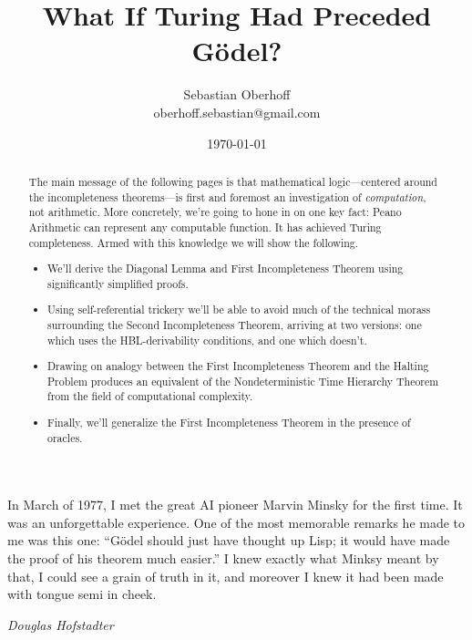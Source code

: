 \documentclass{article}
\theoremstyle{customstyle}
\begin{document}
\title{\vspace{-1cm}What If Turing Had Preceded Gödel?}
\author{Sebastian Oberhoff\\{\small oberhoff.sebastian@gmail.com}}
\date{\today}

\maketitle

\begin{abstract}
  The main message of the following pages is that mathematical logic---centered around the incompleteness theorems---is first and foremost an investigation of \emph{computation}, not arithmetic. More concretely, we're going to hone in on one key fact: Peano Arithmetic can represent any computable function. It has achieved Turing completeness. Armed with this knowledge we will show the following.
  \begin{itemize}
    \item We'll derive the Diagonal Lemma and First Incompleteness Theorem using significantly simplified proofs.
    \item Using self-referential trickery we'll be able to avoid much of the technical morass surrounding the Second Incompleteness Theorem, arriving at two versions: one which uses the HBL-derivability conditions, and one which doesn't.
    \item Drawing on analogy between the First Incompleteness Theorem and the Halting Problem produces an equivalent of the Nondeterministic Time Hierarchy Theorem from the field of computational complexity.
    \item Finally, we'll generalize the First Incompleteness Theorem in the presence of oracles.
  \end{itemize}
\end{abstract}

\epigraph{In March of 1977, I met the great AI pioneer Marvin Minsky for the first time. It was an unforgettable experience. One of the most memorable remarks he made to me was this one: ``Gödel should just have thought up Lisp; it would have made the proof of his theorem much easier.'' I knew exactly what Minksy meant by that, I could see a grain of truth in it, and moreover I knew it had been made with tongue semi in cheek.}{\textit{Douglas Hofstadter}}
\end{document}
